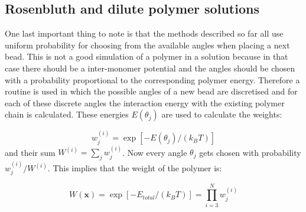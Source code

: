 \subsection*{Rosenbluth and dilute polymer solutions}
One last important thing to note is that the methods described so far all use uniform probability for choosing from the available angles when placing a next bead. This is not a good simulation of a polymer in a solution because in that case there should be a inter-monomer potential and the angles should be chosen with a probability proportional to the corresponding polymer energy.
Therefore a routine is used in which the possible angles of a new bead are discretised and for each of these discrete angles the interaction energy with the existing polymer chain is calculated. These energies $E\!\left(\theta_j\right)$ are used to calculate the weights:

\begin{equation}
	w_j^{(i)} = \exp [-E\left(\theta_j\right) / \left( k_B T \right)]
\end{equation}
and their sum $W^{(i)} = \sum_j w_j^{(i)}$. Now every angle $\theta_j$ gets chosen with probability $w_j^{(i)}/W^{(i)}$. This implies that the weight of the polymer is:

\begin{equation}
	W\!(\mathbf{x}) = \exp\left[-E_{total}/ \left( k_B T \right) \right] = \prod_{i=3}^{N} w_j^{(i)}
\end{equation}